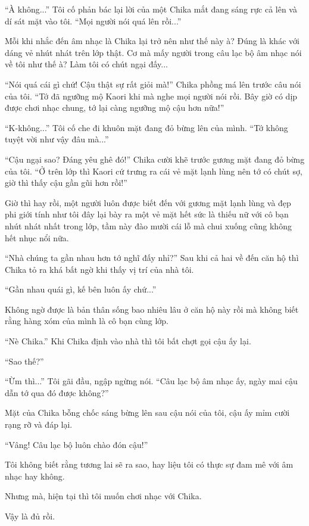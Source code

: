 {``À không...'' Tôi cố phản bác lại lời của một Chika mắt đang sáng rực
cả lên và dí sát mặt vào tôi. ``Mọi người nói quá lên rồi...''

Mỗi khi nhắc đến âm nhạc là Chika lại trở nên như thế này à? Đúng là
khác với dáng vẻ nhút nhát trên lớp thật. Cơ mà mấy người trong câu lạc
bộ âm nhạc nói về tôi như thế à? Làm tôi có chút ngại đấy...

``Nói quá cái gì chứ! Cậu thật sự rất giỏi mà!'' Chika phồng má lên
trước câu nói của tôi. ``Tớ đã ngưỡng mộ Kaori khi mà nghe mọi người nói
rồi. Bây giờ có dịp được chơi nhạc chung, tớ lại càng ngưỡng mộ cậu hơn
nữa!''

``K-không...'' Tôi cố che đi khuôn mặt đang đỏ bừng lên của mình. ``Tớ
không tuyệt vời như vậy đâu mà...''

``Cậu ngại sao? Đáng yêu ghê đó!'' Chika cười khẽ trước gương mặt đang
đỏ bừng của tôi. ``Ở trên lớp thì Kaori cứ trưng ra cái vẻ mặt lạnh lùng
nên tớ có chút sợ, giờ thì thấy cậu gần gũi hơn rồi!''

Giờ thì hay rồi, một người luôn được biết đến với gương mặt lạnh lùng và
đẹp phi giới tính như tôi đây lại bày ra một vẻ mặt hết sức là thiếu nữ
với cô bạn nhút nhát nhất trong lớp, tầm này đào mười cái lỗ mà chui
xuống cũng không hết nhục nổi nữa.

``Nhà chúng ta gần nhau hơn tớ nghĩ đấy nhỉ?'' Sau khi cả hai về đến căn
hộ thì Chika tỏ ra khá bất ngờ khi thấy vị trí của nhà tôi.

``Gần nhau quái gì, kế bên luôn ấy chứ...''

Không ngờ được là bản thân sống bao nhiêu lâu ở căn hộ này rồi mà không
biết rằng hàng xóm của mình là cô bạn cùng lớp.

``Nè Chika.'' Khi Chika định vào nhà thì tôi bất chợt gọi cậu ấy lại.

``Sao thế?''

``Ừm thì...'' Tôi gãi đầu, ngập ngừng nói. ``Câu lạc bộ âm nhạc ấy, ngày
mai cậu dẫn tớ qua đó được không?''

Mặt của Chika bỗng chốc sáng bừng lên sau cậu nói của tôi, cậu ấy mỉm
cười rạng rỡ và đáp lại.

``Vâng! Câu lạc bộ luôn chào đón cậu!''

Tôi không biết rằng tương lai sẽ ra sao, hay liệu tôi có thực sự đam mê
với âm nhạc hay không.

Nhưng mà, hiện tại thì tôi muốn chơi nhạc với Chika.

Vậy là đủ rồi.
}